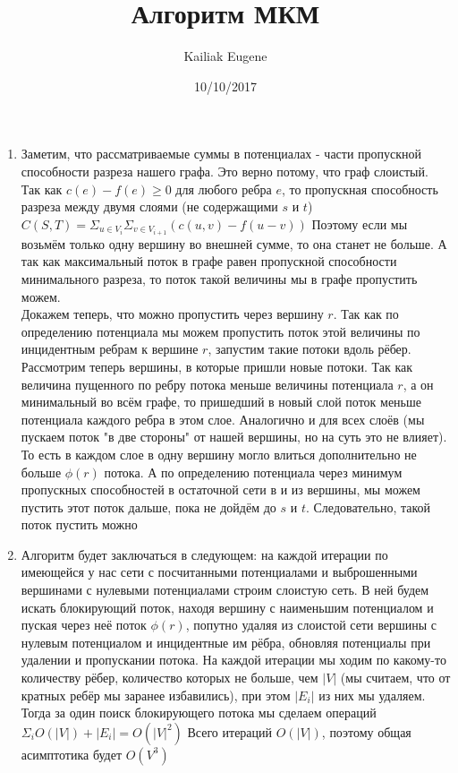 \documentclass[12pt]{article}
\title{Алгоритм МКМ}
\date{10/10/2017}
\author{Kailiak Eugene}
\begin{document}
\maketitle
\begin{enumerate}


\item Заметим, что рассматриваемые суммы в потенциалах - части пропускной способности разреза нашего графа. Это верно потому, что граф слоистый. Так как $c(e) - f(e) \geq 0$ для любого ребра $e$, то пропускная способность разреза между двумя слоями (не содержащими $s$ и $t$) $C(S, T) = \Sigma_{u \in V_i}\Sigma_{v \in V_{i + 1}} (c(u, v) - f(u - v))$ Поэтому если мы возьмём только одну вершину во внешней сумме, то она станет не больше. А так как максимальный поток в графе равен пропускной способности минимального разреза, то поток такой величины мы в графе пропустить можем. \\
Докажем теперь, что можно пропустить через вершину $r$. Так как по определению потенциала мы можем пропустить поток этой величины по инцидентным ребрам к вершине $r$, запустим такие потоки вдоль рёбер. Рассмотрим теперь вершины, в которые пришли новые потоки. Так как величина пущенного по ребру потока меньше величины потенциала $r$, а он минимальный во всём графе, то пришедший в новый слой поток меньше потенциала каждого ребра в этом слое. Аналогично и для всех слоёв (мы пускаем поток "в две стороны" от нашей вершины, но на суть это не влияет). То есть в каждом слое в одну вершину могло влиться дополнительно не больше $\phi(r)$ потока. А по определению потенциала через минимум пропускных способностей в остаточной сети в и из вершины, мы можем пустить этот поток дальше, пока не дойдём до $s$ и $t$. Следовательно, такой поток пустить можно
\item
Алгоритм будет заключаться в следующем: на каждой итерации по имеющейся у нас сети с посчитанными потенциалами и выброшенными вершинами с нулевыми потенциалами строим слоистую сеть. В ней будем искать блокирующий поток, находя вершину с наименьшим потенциалом и пуская через неё поток $\phi(r)$, попутно удаляя из слоистой сети вершины с нулевым потенциалом и инцидентные им рёбра, обновляя потенциалы при удалении и пропускании потока. На каждой итерации мы ходим по какому-то количеству рёбер, количество которых не больше, чем $|V|$ (мы считаем, что от кратных ребёр мы заранее избавились), при этом $|E_i|$ из них мы удаляем. Тогда за один поиск блокирующего потока мы сделаем операций $\Sigma_i {O(|V|) + |E_i|} = O(|V|^2)$ Всего итераций $O(|V|)$, поэтому общая асимптотика будет $O({V}^3)$

\end{enumerate}
\end{document}
